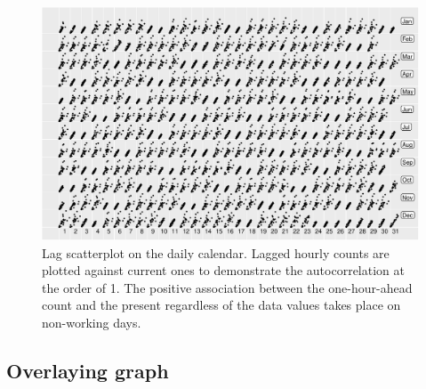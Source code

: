 \documentclass[article]{jss}
\begin{document}
\begin{CodeChunk}
\begin{figure}

{\centering \includegraphics[width=\textwidth]{figure/scatterplot-1} 

}

\caption[Lag scatterplot on the daily calendar]{Lag scatterplot on the daily calendar. Lagged hourly counts are plotted against current ones to demonstrate the autocorrelation at the order of 1. The positive association between the one-hour-ahead count and the present regardless of the data values takes place on non-working days.}\label{fig:scatterplot}
\end{figure}
\end{CodeChunk}

\subsection{Overlaying graph}\label{overlaying-graph}
\end{document}
